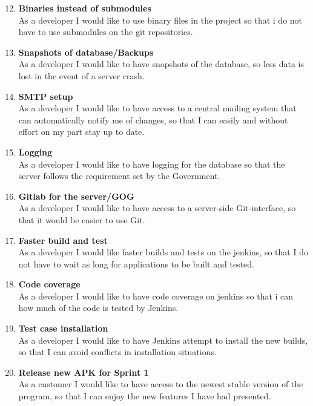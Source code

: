 \begin{enumerate}
	\setcounter{enumi}{11} %
	\item \textbf{Binaries instead of submodules}\\
	As a developer I would like to use binary files in the project so that i do not have to use submodules on the git repositories.
	
	\item \textbf{Snapshots of database/Backups}\\
	As a developer I would like to have snapshots of the database, so less data is lost in the event of a server crash.
	
	\item \textbf{SMTP setup}\\
	As a developer I would like to have access to a central mailing system that can automatically notify me of changes, so that I can easily and without effort on my part stay up to date.
	
	\item \textbf{Logging}\\
	As a developer I would like to have logging for the database so that the server follows the requirement set by the Government.
	
	\item \textbf{Gitlab for the server/GOG}\\
	As a developer I would like to have access to a server-side Git-interface, so that it would be easier to use Git.
	
	\item \textbf{Faster build and test}\\
	As a developer I would like faster builds and tests on the jenkins, so that I do not have to wait as long for applications to be built and tested.
	
	\item \textbf{Code coverage}\\
	As a developer I would like to have code coverage on jenkins so that i can how much of the code is tested by Jenkins.
	
	\item \textbf{Test case installation}\\
	As a developer I would like to have Jenkins attempt to install the new builds, so that I can avoid conflicts in installation situations.
	
	\item \textbf{Release new APK for Sprint 1}\\
	As a customer I would like to have access to the newest stable version of the program, so that I can enjoy the new features I have had presented.
	

\end{enumerate}
